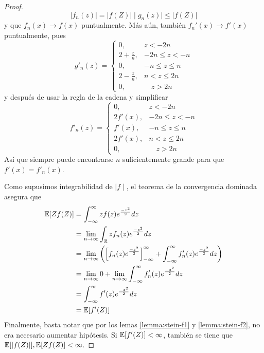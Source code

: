 \documentclass[main.tex]{subfiles}
\begin{document}
\begin{theorem}
\begin{proof}
        \begin{equation*}
            \mid f_n(z) \mid = | f(Z) | \mid g_n(z) \mid \leq | f(Z) |
        \end{equation*}
        y que $f_n(x) \rightarrow f(x)$ puntualmente. Más aún, también $f_n'(x) \rightarrow f'(x)$ puntualmente, pues
        \begin{equation*}
            g'_n(z) = 
            \begin{cases}
                0, & z < -2n \\
                2 + \frac{z}{n}, & -2n \leq z < -n \\
                0, & -n \leq z \leq n \\
                2 - \frac{z}{n}, & n < z \leq 2n \\
                0, & \quad z > 2n
            \end{cases}
        \end{equation*}
        y después de usar la regla de la cadena y simplificar
        \begin{equation*}
            f'_n(z) = 
            \begin{cases}
                0, & z < -2n \\
                2f'(x), & -2n \leq z < -n \\
                f'(x), & -n \leq z \leq n \\
                2f'(x), & n < z \leq 2n \\
                0, & \quad z > 2n
            \end{cases}
        \end{equation*}
        Así que siempre puede encontrarse $n$ suficientemente grande para que $f'(x) = f'_n(x)$.
        
        Como supusimos integrabilidad de $\mid f \mid$, el teorema de la convergencia dominada asegura que
        \begin{align}
        \begin{split}
            \operatorname{\mathbb{E}}[Zf(Z)] &= \int_{-\infty}^\infty zf(z)e^{\frac{-z^2}{2}} dz \\
            &= \lim_{n\rightarrow\infty}\int_{\operatorname{\mathbb{R}}}zf_n(z)e^{\frac{-z^2}{2}} dz \\
            &= \lim_{n\rightarrow\infty}\left(
                    \left[f_n(z)e^{\frac{-z^2}{2}} \right]_{-\infty}^\infty  + \int_{-\infty}^\infty f_n'(z)e^{\frac{-z^2}{2}}dz
                \right) \\
            &= \lim_{n\rightarrow\infty}0 + \lim_{n\rightarrow\infty}\int_{-\infty}^\infty f_n'(z)e^{\frac{-z^2}{2}}dz \\
            &= \int_{-\infty}^\infty f'(z)e^{\frac{-z^2}{2}}dz \\
            &= \operatorname{\mathbb{E}}[f'(Z)]
        \end{split}
        \end{align}
        Finalmente, basta notar que por los lemas \eqref{lemma:stein-f1} y \eqref{lemma:stein-f2}, no era necesario aumentar hipótesis. Si $\operatorname{\mathbb{E}}[f'(Z)] < \infty$, también se tiene que $\operatorname{\mathbb{E}}[| f(Z) |], \operatorname{\mathbb{E}}[Zf(Z)] < \infty$.


\end{proof}
\end{theorem}
\end{document}
